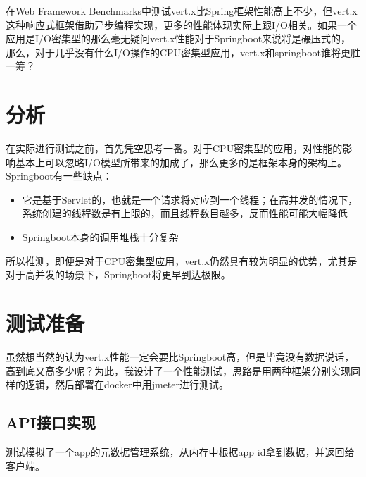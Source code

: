 \documentclass[12pt]{article}
\begin{document}
\makeblogtitle

在\href{https://www.techempower.com}{Web Framework Benchmarks}中测试vert.x比Spring框架性能高上不少，但vert.x这种响应式框架借助异步编程实现，更多的性能体现实际上跟I/O相关。如果一个应用是I/O密集型的那么毫无疑问vert.x性能对于Springboot来说将是碾压式的，那么，对于几乎没有什么I/O操作的CPU密集型应用，vert.x和springboot谁将更胜一筹？

\section{分析}\label{ux5206ux6790}

在实际进行测试之前，首先凭空思考一番。对于CPU密集型的应用，对性能的影响基本上可以忽略I/O模型所带来的加成了，那么更多的是框架本身的架构上。Springboot有一些缺点：

\begin{itemize}
\tightlist
\item
  它是基于Servlet的，也就是一个请求将对应到一个线程；在高并发的情况下，系统创建的线程数是有上限的，而且线程数目越多，反而性能可能大幅降低
\item
  Springboot本身的调用堆栈十分复杂
\end{itemize}

所以推测，即便是对于CPU密集型应用，vert.x仍然具有较为明显的优势，尤其是对于高并发的场景下，Springboot将更早到达极限。

\section{测试准备}\label{ux6d4bux8bd5ux51c6ux5907}

虽然想当然的认为vert.x性能一定会要比Springboot高，但是毕竟没有数据说话，高到底又高多少呢？为此，我设计了一个性能测试，思路是用两种框架分别实现同样的逻辑，然后部署在docker中用jmeter进行测试。

\subsection{API接口实现}\label{apiux63a5ux53e3ux5b9eux73b0}

测试模拟了一个app的元数据管理系统，从内存中根据app id拿到数据，并返回给客户端。

\begin{Shaded}
\begin{Highlighting}[]
\OperatorTok{(}\OperatorTok{)}
\OperatorTok{(} \OperatorTok{)}
        \OperatorTok{,}\OperatorTok{,}\OperatorTok{\{}
    \OperatorTok{(}\OperatorTok{);}
\OperatorTok{\}}
\end{Highlighting}
\end{Shaded}
\end{document}
